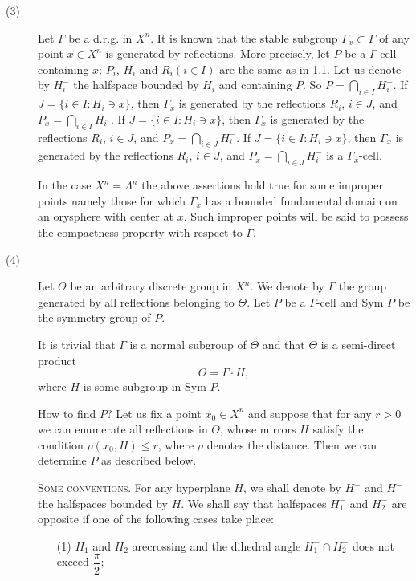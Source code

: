 \begin{description}
\item[(3)] Let $\Gamma$ be a d.r.g. in $X^n$. It is known that the stable subgroup $\Gamma_x \subset \Gamma$ of any point $x \in X^n$ is generated by reflections. More precisely, let $P$ be a $\Gamma$-cell containing $x$; $P_i$, $H_i$ and $R_i (i \in I)$  are the same as in 1.1. Let us denote by $H^-_i$ the halfspace bounded  by $H_i$ and containing $P$. So $P= \bigcap\limits_{i \in I} H^-_i$. If $J = \{i \in I : H_i \ni x\}$, then $\Gamma_x$ is generated by the reflections $R_i$, $i \in J$, and $P_x = \bigcap\limits_{i \in I} H^-_i$. If $J = \{i \in I: H_i \ni x\}$, then $\Gamma_x$ is generated by the reflections $R_i$, $i \in J$, and $P_x = \bigcap\limits_{i \in J} H^-_i$. If $J = \{i \in I: H_i \ni x\}$, then $\Gamma_x$ is generated by the reflections $R_i$, $i \in J$, and $P_x = \bigcap\limits_{i \in J}H^-_i$  is a $\Gamma_x$-cell.

In the case $X^n = \Lambda^n$ the above assertions hold true for some improper points namely those for which $\Gamma_x$ has a bounded fundamental domain on an orysphere with  center at $x$. Such improper points will be said to possess the compactness property with respect to $\Gamma$. 

\item[(4)] Let $\Theta$ be an arbitrary discrete group in $X^n$. We denote by $\Gamma$ the group generated by all reflections belonging to $\Theta$. Let $P$ be a $\Gamma$-cell and Sym $P$ be the symmetry group of $P$.

It is trivial that $\Gamma$ is a normal subgroup of $\Theta$ and that $\Theta$ is a semi-direct product 
\begin{equation}
\Theta = \Gamma \cdot H, \label{art10-eq1.1} 
\end{equation}
where $H$ is some subgroup in Sym $P$.

How to find $P$? Let us fix a point $x_0 \in X^n$ and suppose that for any $r >0$ we can enumerate all reflections in $\Theta$, whose mirrors $H$ satisfy the condition $\rho (x_0, H) \leqslant r$, where $\rho$ denotes the distance. Then we can determine $P$ as described below.

\medskip
\textsc{Some conventions.} For any hyperplane $H$, we shall denote by $H^+$ and $H^-$ the halfspaces bounded by $H$. We shall say that halfspaces $H^-_1$ and $H^-_2$ are opposite if one of the following cases take place:
\begin{itemize}
\item[(1)] $H_1$ and $H_2$ are\pageoriginale crossing and the dihedral angle $H^-_1 \cap H^-_2$ does not exceed $\dfrac{\pi}{2}$;


\end{itemize}
\end{description}
